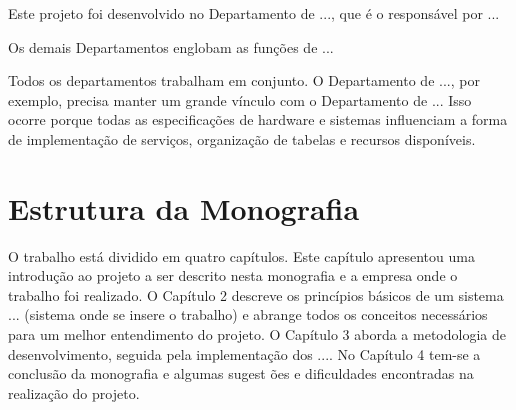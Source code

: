 Este projeto foi desenvolvido no Departamento de ..., que é o responsável por ...

Os demais Departamentos englobam as fun\c{c}\~oes de ...

Todos os departamentos trabalham em conjunto. O Departamento de ..., por exemplo, precisa manter um grande vínculo com o Departamento de ... Isso ocorre porque todas as especifica\c{c}\~oes de hardware e sistemas influenciam a forma de implementa\c{c}ão de servi\c{c}os, organiza\c{c}\~ao de tabelas e recursos disponíveis.




\section{Estrutura da Monografia}

O trabalho está dividido em quatro capítulos. Este capítulo apresentou uma introdução ao projeto a ser descrito nesta monografia e a empresa onde o trabalho foi realizado. O Capítulo 2 descreve os princípios básicos de um sistema ... (sistema onde se insere o trabalho) e abrange todos os conceitos necessários para um melhor entendimento do projeto. O Capítulo 3 aborda a metodologia de desenvolvimento, seguida pela implementa\c{c}\~ao dos .... No Capítulo 4 tem-se a conclusão da  monografia e algumas sugest \~oes e dificuldades encontradas na realização do projeto.


\clearpage